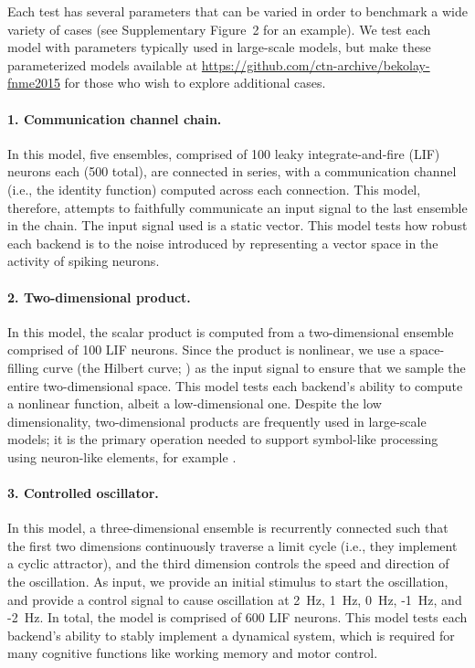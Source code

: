 \documentclass{frontiersSCNS}
\begin{document}
Each test has several parameters
that can be varied
in order to benchmark a wide variety of cases
(see Supplementary Figure~2 for an example).
We test each model with parameters
typically used in large-scale models,
but make these parameterized models
available at \url{https://github.com/ctn-archive/bekolay-fnme2015}
for those who wish to explore additional cases.

\paragraph{1. Communication channel chain.}
In this model,
five ensembles,
comprised of 100 leaky integrate-and-fire (LIF) neurons each
(500 total),
are connected in series,
with a communication channel
(i.e., the identity function)
computed across each connection.
This model, therefore, attempts to faithfully
communicate an input signal to
the last ensemble in the chain.
The input signal used is a static vector.
This model tests how
robust each backend is to the noise introduced
by representing a vector space
in the activity of spiking neurons.

\paragraph{2. Two-dimensional product.}
In this model,
the scalar product is computed
from a two-dimensional ensemble
comprised of 100 LIF neurons.
Since the product is nonlinear,
we use a space-filling curve
(the Hilbert curve; \citealp{hilbert1891})
as the input signal to ensure that
we sample the entire two-dimensional space.
This model tests each backend's
ability to compute a nonlinear function,
albeit a low-dimensional one.
Despite the low dimensionality,
two-dimensional products are frequently used
in large-scale models;
it is the primary operation needed to support
symbol-like processing using neuron-like elements,
for example \citep{eliasmith2013}.

\paragraph{3. Controlled oscillator.}
In this model,
a three-dimensional ensemble is recurrently connected
such that the first two dimensions continuously
traverse a limit cycle
(i.e., they implement a cyclic attractor),
and the third dimension controls the speed
and direction of the oscillation.
As input, we provide an initial stimulus
to start the oscillation,
and provide a control signal
to cause oscillation at
2~Hz, 1~Hz, 0~Hz, -1~Hz, and -2~Hz.
In total, the model is comprised of 600 LIF neurons.
This model tests each backend's ability
to stably implement a dynamical system,
which is required for many cognitive functions
like working memory and motor control.
\end{document}
